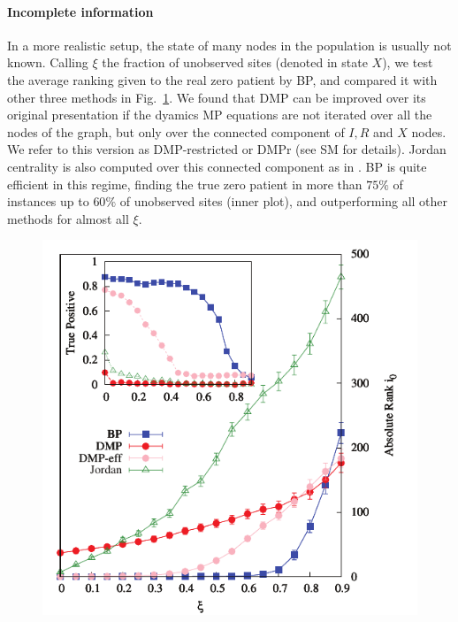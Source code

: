 \paragraph*{Incomplete information}

In a more realistic setup, the state of many nodes in the population is usually not known. Calling $\xi$ the fraction of unobserved sites (denoted in state $X$), we test the average ranking given to the real zero patient by BP, and compared it with other three methods in Fig.~\ref{fig:rank_vs_obs}. We found that DMP can be improved over its original presentation if the dyamics MP equations are not iterated over all the nodes of the graph, but only over the connected component of $I,R$ and $X$ nodes. We refer to this version as DMP-restricted or DMPr (see SM for details). Jordan centrality is also computed over this connected component as in \cite{lokhov_inferring_2013}. BP is quite efficient in this regime, finding the true zero patient in more than $75\%$ of instances up to $60\%$ of unobserved sites (inner plot), and outperforming all other methods for almost all $\xi$.%

\begin{figure}
\includegraphics[width=1\columnwidth, angle=0]{zero_patient/T11_rank_vs_obs}
\caption{\label{fig:rank_vs_obs} }
\end{figure}

